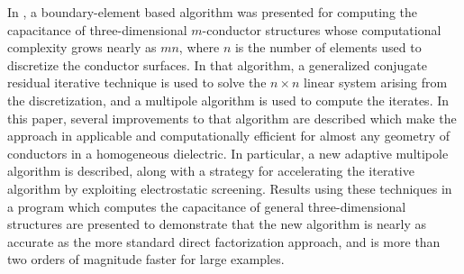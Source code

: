 
\noindent In \cite{nabors91}, a boundary-element based
algorithm was presented for computing the capacitance of
three-dimensional $m$-conductor structures whose computational
complexity grows nearly as $mn$, where $ n $ is the number of elements
used to discretize the conductor surfaces.  In that algorithm, a
generalized conjugate residual iterative technique is used to solve
the $n\times n$ linear system arising from the discretization, and a
multipole algorithm is used to compute the iterates.  In this paper,
several improvements to that algorithm are described which make the
approach in \cite{nabors91} applicable and computationally efficient for
almost any geometry of conductors in a homogeneous dielectric.  In
particular, a new adaptive multipole algorithm is described, along
with a strategy for accelerating the iterative algorithm by exploiting
electrostatic screening.  Results using these techniques in a program
which computes the capacitance of general three-dimensional structures
are presented to demonstrate that the new algorithm is nearly as
accurate as the more standard direct factorization approach, and is
more than two orders of magnitude faster for large examples.

